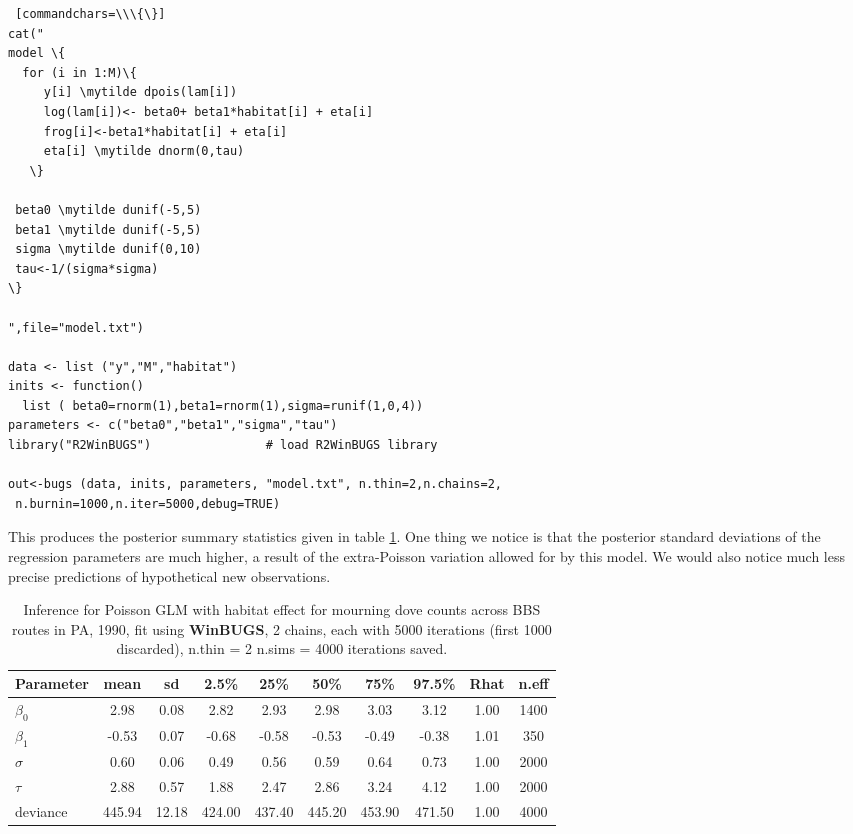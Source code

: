 {{\begin{Verbatim} [commandchars=\\\{\}]
cat("
model \{
  for (i in 1:M)\{
     y[i] \mytilde dpois(lam[i])
     log(lam[i])<- beta0+ beta1*habitat[i] + eta[i]
     frog[i]<-beta1*habitat[i] + eta[i]
     eta[i] \mytilde dnorm(0,tau)
   \}

 beta0 \mytilde dunif(-5,5)
 beta1 \mytilde dunif(-5,5)
 sigma \mytilde dunif(0,10)
 tau<-1/(sigma*sigma)
\}

",file="model.txt")

data <- list ("y","M","habitat")
inits <- function()
  list ( beta0=rnorm(1),beta1=rnorm(1),sigma=runif(1,0,4))
parameters <- c("beta0","beta1","sigma","tau")
library("R2WinBUGS")                # load R2WinBUGS library

out<-bugs (data, inits, parameters, "model.txt", n.thin=2,n.chains=2,
 n.burnin=1000,n.iter=5000,debug=TRUE)
\end{Verbatim}


This produces the posterior summary statistics given in table \ref{glms.tab.bbspoisreg}. 
One thing we notice is
that the posterior standard deviations of the regression parameters
are much higher, a result of the extra-Poisson variation allowed for
by this model. We would also
notice much less precise predictions of hypothetical new
observations.



\begin{table}
\caption{Inference for Poisson GLM with habitat effect for mourning
  dove counts across BBS routes in PA, 1990, fit using 
{\bf WinBUGS},
 2 chains, each with 5000 iterations (first 1000 discarded), n.thin = 2
 n.sims = 4000 iterations saved.}
   \scriptsize
  \begin{tabular}{lccccccccc}
    \hline
        \hline
 Parameter &    mean   & sd   &  2.5\%    &  25\%  &    50\%   &   75\%  &  97.5\% & Rhat & n.eff \\
     \hline
$\beta_0$   &   2.98 & 0.08 &  2.82 &  2.93  & 2.98 &  3.03 &  3.12 & 1.00 & 1400 \\
$\beta_1$   &  -0.53 & 0.07 & -0.68 & -0.58 & -0.53 & -0.49 & -0.38 & 1.01 &  350 \\
$\sigma$   &   0.60 & 0.06 &  0.49 &  0.56 &  0.59 &  0.64 &  0.73 & 1.00 & 2000 \\
$\tau$     &   2.88 & 0.57 &  1.88 &  2.47 &  2.86 &  3.24 &  4.12 & 1.00 & 2000 \\
deviance & 445.94 & 12.18 & 424.00 & 437.40 & 445.20 & 453.90 & 471.50 & 1.00 & 4000 \\
    \hline
  \end{tabular}
  \label{glms.tab.bbspoisreg}
\vspace{0.5cm}
\end{table}


}}
